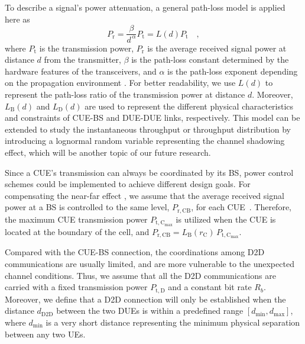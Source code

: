 \documentclass[journal, 10pt]{IEEEtran}
\begin{document}
To describe a signal's power attenuation, a general path-loss 
model is applied here as
\begin{equation}
\label{eq:path-loss} P_{\mathrm r} = \frac{\beta}{d^{\,\alpha}}
P_\mathrm{t} = L(d) P_{\mathrm t}\quad, 
\end{equation} 
where $P_\mathrm{t}$ is the transmission power, $P_\mathrm{r}$ is the
average received signal power at distance $d$ from the transmitter,
$\beta$ is the path-loss constant determined by the hardware features
of the transceivers, and $\alpha$ is the path-loss exponent depending
on the propagation environment \cite{Rappaport:01Book}. For better
readability, we use $L(d)$ to represent the path-loss ratio of the
transmission power at distance $d$. Moreover, $L_\mathrm{B}(d)$ and
$L_\mathrm{D}(d)$ are used to represent the different physical
characteristics and constraints of CUE-BS and DUE-DUE links,
respectively. This model can be extended to study the instantaneous
throughput or throughput distribution by introducing a lognormal
random variable representing the channel shadowing effect, which will
be another topic of our future research.


Since a CUE's transmission can always be coordinated by its BS, power
control schemes could be implemented to achieve different design
goals. For compensating the near-far effect , we assume that the average
received signal power at a BS is controlled to the same level,
$P_{\mathrm{r, CB}}$, for each CUE~\cite{Min:11TWC-b}. Therefore, the
maximum CUE transmission power $P_{\mathrm{t, C_{max}}}$ is utilized
when the CUE is located at the boundary of the cell, and $P_\mathrm{r,
CB} = L_\mathrm{B} (r_\mathrm{C})\, P_\mathrm{t, C_{max}}$.


Compared with the CUE-BS connection, the coordinations among D2D
communications are usually limited, and are more vulnerable to the
unexpected channel conditions. Thus, we assume that all the D2D
communications are carried with a fixed transmission power
$P_{\mathrm{t, D}}$ and a constant bit rate $R_b$. Moreover, we define
that a D2D connection will only be established when the distance
$d_{\mathrm{D2D}}$ between the two DUEs is within a predefined range
$[d_{\min}, d_{\max}]$, where $d_{\min}$ is a very short distance
representing the minimum physical separation between any two UEs.
\end{document}
